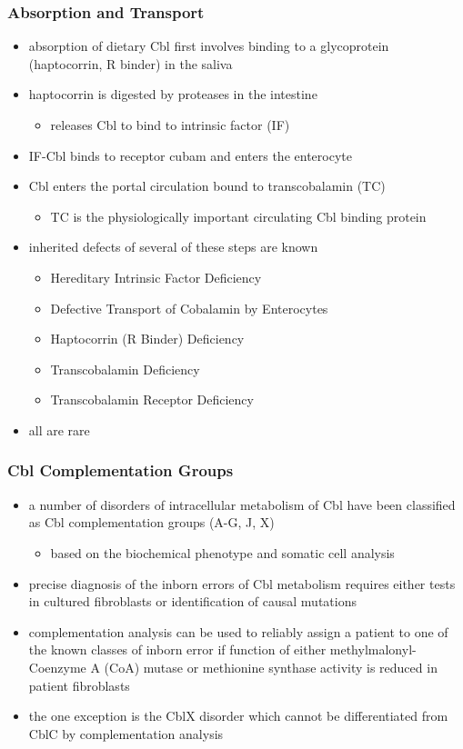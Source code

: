\documentclass[12pt]{scrartcl}
\begin{document}
\subsubsection{Absorption and Transport}
\label{sec:org573d1a8}
\begin{itemize}
\item absorption of dietary Cbl first involves binding to a glycoprotein
(haptocorrin, R binder) in the saliva
\item haptocorrin is digested by proteases in the intestine
\begin{itemize}
\item releases Cbl to bind to intrinsic factor (IF)
\end{itemize}
\item IF-Cbl binds to receptor cubam and enters the enterocyte
\item Cbl enters the portal circulation bound to transcobalamin (TC)
\begin{itemize}
\item TC is the physiologically important circulating Cbl binding
protein
\end{itemize}
\item inherited defects of several of these steps are known
\begin{itemize}
\item Hereditary Intrinsic Factor Deficiency
\item Defective Transport of Cobalamin by Enterocytes
\item Haptocorrin (R Binder) Deficiency
\item Transcobalamin Deficiency
\item Transcobalamin Receptor Deficiency
\end{itemize}
\item all are rare
\end{itemize}
\subsubsection{Cbl Complementation Groups}
\label{sec:org4ebb96c}
\begin{itemize}
\item a number of disorders of intracellular metabolism of Cbl have been
classified as Cbl complementation groups (A-G, J, X)
\begin{itemize}
\item based on the biochemical phenotype and somatic cell analysis
\end{itemize}
\item precise diagnosis of the inborn errors of Cbl metabolism requires
either tests in cultured fibroblasts or identification of causal
mutations
\item complementation analysis can be used to reliably assign a patient to
one of the known classes of inborn error if function of either
methylmalonyl-Coenzyme A (CoA) mutase or methionine synthase
activity is reduced in patient fibroblasts
\item the one exception is the CblX disorder which cannot be
differentiated from CblC by complementation analysis
\end{itemize}
\end{document}
